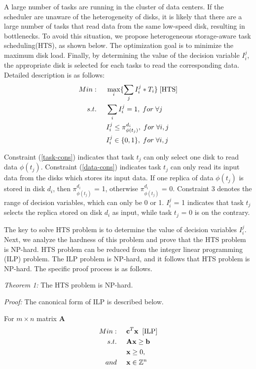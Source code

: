\documentclass[conference]{IEEEtran}
\begin{document}
A large number of tasks are running in the cluster of data centers. If the scheduler are unaware of the heterogeneity of disks, it is likely that there are a large number of tasks that read data from the same low-speed disk, resulting in bottlenecks. To avoid this situation, we propose heterogeneous storage-aware task scheduling(HTS), as shown below. The optimization goal is to minimize the maximum disk load. Finally, by determining the value of the decision variable $I_i^j$, the appropriate disk is selected for each tasks to read the corresponding data. Detailed description is as follows:
\begin{align}
Min:&\;\;\;\;\;\max\limits_{i}\{\sum_{j}I_i^j*T_i\}\;[\rm{HTS}]\nonumber\\
s.t. 
&\;\;\;\;\;\sum_{i}I_i^j = 1,\;for\;\forall j\label{task-cons}\\
&\;\;\;\;\;I_i^j \leq \pi_{\phi(t_j)}^{d_i},\;for\;\forall i,j\label{data-cons}\\
&\;\;\;\;\;I_i^j\in\{0,1\},\;for\;\forall i,j\label{def-cons}
\end{align}

Constraint (\ref{task-cons}) indicates that task $t_j$ can only select one disk to read data $\phi(t_j)$. Constraint (\ref{data-cons}) indicates task $t_j$ can only read its input data from the disks which stores its input data. If one replica of data $\phi(t_j)$ is stored in disk $d_i$, then $\pi_{\phi(t_j)}^{d_i}$ = 1, otherwise $\pi_{\phi(t_j)}^{d_i}$ = 0. Constraint 3 denotes the range of decision variables, which can only be 0 or 1. $I_i^j$ = 1 indicates that task $t_j$ selects the replica stored on disk $d_i$ as input, while task $t_j$ = 0 is on the contrary.

The key to solve HTS problem is to determine the value of decision variables {$I_i^j$}. Next, we analyze the hardness of this problem and prove that the HTS problem is NP-hard. HTS problem can be reduced from the integer linear programming (ILP) problem. The ILP problem is NP-hard, and it follows that HTS problem is NP-hard. The specific proof process is as follows.

\emph{Theorem 1:} The HTS problem is NP-hard.

\emph{Proof:}
The canonical form \cite{b11} of ILP is described below.

For $m\times n$ matrix \textbf{A}
\begin{align}
Min:&\;\;\;\;\;\textbf{c}^T\textbf{x}\;\;[\rm{ILP}]\label{ILP}\\
s.t. 
&\;\;\;\;\;\textbf{A}\textbf{x}\geq \textbf{b}\nonumber\\
&\;\;\;\;\;\textbf{x} \geq0,\nonumber\\ 
and
&\;\;\;\;\;\textbf{x} \in \mathbb{Z}^n\nonumber
\end{align}
\end{document}
